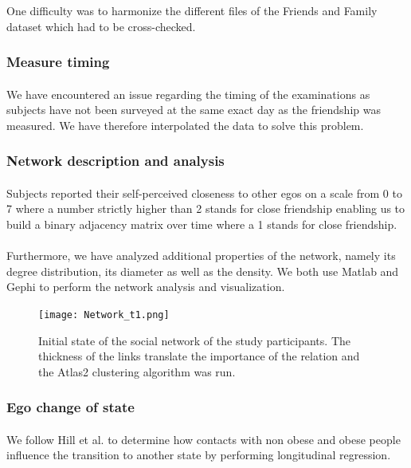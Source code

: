 \documentclass[11pt]{article}
\begin{document}
One difficulty was to harmonize the different files of the Friends and Family dataset which had to be cross-checked.

\subsubsection{Measure timing}
\paragraph{}
We have encountered an issue regarding the timing of the examinations as subjects have not been surveyed at the same exact day as the friendship was measured. We have therefore interpolated the data to solve this problem.

\subsubsection{Network description and analysis}
\paragraph{}
Subjects reported their self-perceived closeness to other egos on a scale from 0 to 7 where a number strictly higher than 2 stands for close friendship enabling us to build a binary adjacency matrix over time where a 1 stands for close friendship.

\paragraph{}

Furthermore, we have analyzed additional properties of the network, namely its degree distribution, its diameter as well as the density. We both use Matlab and Gephi to perform the network analysis and visualization.

\begin{figure}[!ht]
\center
   \texttt{[image: Network\_t1.png]}
   \caption{\label{4} Initial state of the social network of the study participants. The thickness of the links translate the importance of the relation and the Atlas2 clustering algorithm was run.}
\end{figure}

\subsubsection{Ego change of state}
\paragraph{}
We follow Hill et al. to determine how contacts with non obese and obese people influence the transition to another state by performing longitudinal regression. 
\end{document}
